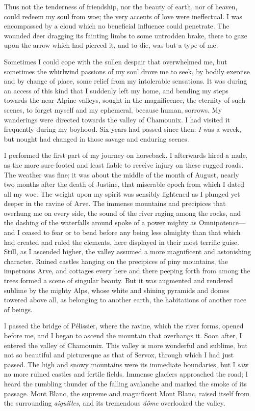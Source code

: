 \documentclass[12pt,openright]{book}
\begin{document}
Thus not the tenderness of friendship, nor the beauty of earth, nor of heaven, could redeem my soul from woe; the very accents of love were ineffectual. I was encompassed by a cloud which no beneficial influence could penetrate. The wounded deer dragging its fainting limbs to some untrodden brake, there to gaze upon the arrow which had pierced it, and to die, was but a type of me.

Sometimes I could cope with the sullen despair that overwhelmed me, but sometimes the whirlwind passions of my soul drove me to seek, by bodily exercise and by change of place, some relief from my intolerable sensations. It was during an access of this kind that I suddenly left my home, and bending my steps towards the near Alpine valleys, sought in the magnificence, the eternity of such scenes, to forget myself and my ephemeral, because human, sorrows. My wanderings were directed towards the valley of Chamounix. I had visited it frequently during my boyhood. Six years had passed since then: \textit{I} was a wreck, but nought had changed in those savage and enduring scenes.

I performed the first part of my journey on horseback. I afterwards hired a mule, as the more sure-footed and least liable to receive injury on these rugged roads. The weather was fine; it was about the middle of the month of August, nearly two months after the death of Justine, that miserable epoch from which I dated all my woe. The weight upon my spirit was sensibly lightened as I plunged yet deeper in the ravine of Arve. The immense mountains and precipices that overhung me on every side, the sound of the river raging among the rocks, and the dashing of the waterfalls around spoke of a power mighty as Omnipotence—and I ceased to fear or to bend before any being less almighty than that which had created and ruled the elements, here displayed in their most terrific guise. Still, as I ascended higher, the valley assumed a more magnificent and astonishing character. Ruined castles hanging on the precipices of piny mountains, the impetuous Arve, and cottages every here and there peeping forth from among the trees formed a scene of singular beauty. But it was augmented and rendered sublime by the mighty Alps, whose white and shining pyramids and domes towered above all, as belonging to another earth, the habitations of another race of beings.

I passed the bridge of Pélissier, where the ravine, which the river forms, opened before me, and I began to ascend the mountain that overhangs it. Soon after, I entered the valley of Chamounix. This valley is more wonderful and sublime, but not so beautiful and picturesque as that of Servox, through which I had just passed. The high and snowy mountains were its immediate boundaries, but I saw no more ruined castles and fertile fields. Immense glaciers approached the road; I heard the rumbling thunder of the falling avalanche and marked the smoke of its passage. Mont Blanc, the supreme and magnificent Mont Blanc, raised itself from the surrounding \textit{aiguilles}, and its tremendous \textit{dôme} overlooked the valley.
\end{document}

